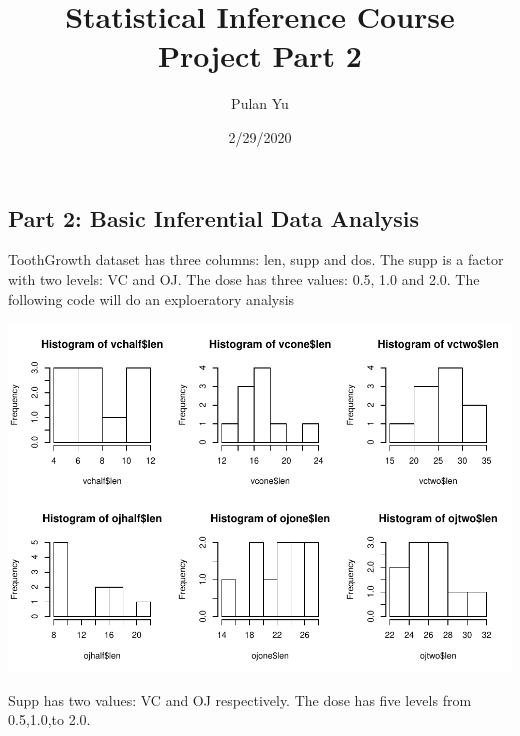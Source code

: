 \documentclass[
]{article}
\title{Statistical Inference Course Project Part 2}
\author{Pulan Yu}
\date{2/29/2020}
\begin{document}
\maketitle

\hypertarget{part-2-basic-inferential-data-analysis}{%
\subsection{Part 2: Basic Inferential Data
Analysis}\label{part-2-basic-inferential-data-analysis}}

ToothGrowth dataset has three columns: len, supp and dos. The supp is a
factor with two levels: VC and OJ. The dose has three values: 0.5, 1.0
and 2.0. The following code will do an exploeratory analysis

\includegraphics{Final_project_2_final_files/figure-latex/unnamed-chunk-1-1.pdf}

Supp has two values: VC and OJ respectively. The dose has five levels
from 0.5,1.0,to 2.0.
\end{document}
